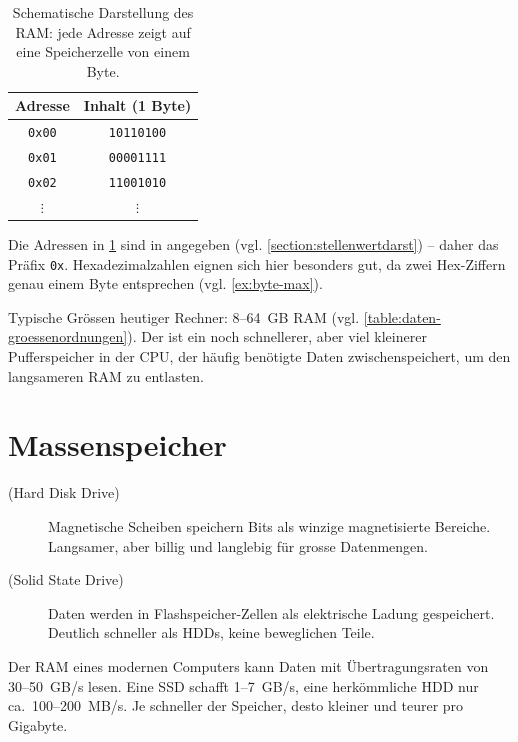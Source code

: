 \begin{table}[H]
    \centering
    \begin{tabular}{c|c}
        \textbf{Adresse} & \textbf{Inhalt (1 Byte)} \\\midrule\midrule
        \texttt{0x00} & \texttt{10110100} \\\midrule
        \texttt{0x01} & \texttt{00001111} \\\midrule
        \texttt{0x02} & \texttt{11001010} \\\midrule
        $\vdots$ & $\vdots$ \\
    \end{tabular}
    \caption{Schematische Darstellung des RAM: jede Adresse zeigt auf eine Speicherzelle von einem Byte.}
    \label{tab:ram}
\end{table}

\begin{myattention}
    Die Adressen in \cref{tab:ram} sind in  angegeben (vgl. \cref{section:stellenwertdarst}) -- daher das Präfix \texttt{0x}. Hexadezimalzahlen eignen sich hier besonders gut, da zwei Hex-Ziffern genau einem Byte entsprechen (vgl. \cref{ex:byte-max}).
\end{myattention}

Typische Grössen heutiger Rechner: 8--64~GB RAM (vgl. \cref{table:daten-groessenordnungen}). Der  ist ein noch schnellerer, aber viel kleinerer Pufferspeicher in der CPU, der häufig benötigte Daten zwischenspeichert, um den langsameren RAM zu entlasten.

\section{Massenspeicher}

\begin{description}
    \item[ (Hard Disk Drive)] Magnetische Scheiben speichern Bits als winzige magnetisierte Bereiche. Langsamer, aber billig und langlebig für grosse Datenmengen.
    \item[ (Solid State Drive)] Daten werden in Flashspeicher-Zellen als elektrische Ladung gespeichert. Deutlich schneller als HDDs, keine beweglichen Teile.
\end{description}

\begin{myexample}
    Der RAM eines modernen Computers kann Daten mit Übertragungsraten von 30--50~GB/s lesen. Eine SSD schafft 1--7~GB/s, eine herkömmliche HDD nur ca.\ 100--200~MB/s. Je schneller der Speicher, desto kleiner und teurer pro Gigabyte.
\end{myexample}

